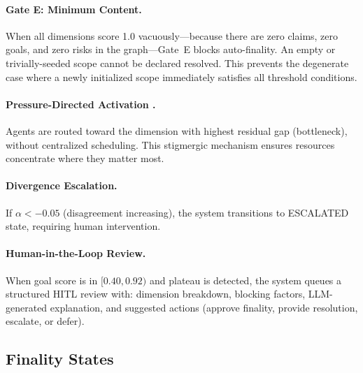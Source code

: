 \documentclass[11pt]{article}
\begin{document}
\paragraph{Gate E: Minimum Content.}
When all dimensions score 1.0 vacuously---because there are zero claims, zero goals, and zero risks in the graph---Gate~E blocks auto-finality. An empty or trivially-seeded scope cannot be declared resolved. This prevents the degenerate case where a newly initialized scope immediately satisfies all threshold conditions.

\paragraph{Pressure-Directed Activation \cite{dorigo2000}.}
Agents are routed toward the dimension with highest residual gap (bottleneck), without centralized scheduling. This stigmergic mechanism ensures resources concentrate where they matter most.

\paragraph{Divergence Escalation.}
If $\alpha < -0.05$ (disagreement increasing), the system transitions to ESCALATED state, requiring human intervention.

\paragraph{Human-in-the-Loop Review.}
When goal score is in $[0.40, 0.92)$ and plateau is detected, the system queues a structured HITL review with: dimension breakdown, blocking factors, LLM-generated explanation, and suggested actions (approve finality, provide resolution, escalate, or defer).

\subsection{Finality States}
\end{document}
